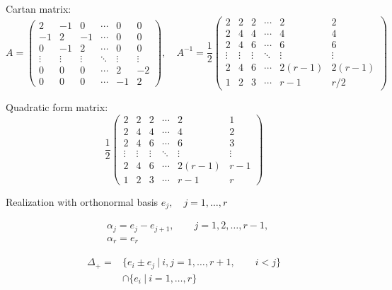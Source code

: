 \documentclass[12pt]{article}
\begin{document}
Cartan matrix:
\[
A=\left(
\begin{array}{cccccc}
 2 & -1& 0 &\cdots & 0 & 0 \\
 -1& 2 & -1 &\cdots & 0 & 0 \\
 0 & -1 & 2 &\cdots & 0 & 0 \\
  \vdots&\vdots &\vdots &\ddots &\vdots &\vdots \\
 0&0 &0 &\cdots & 2& -2\\
 0&0 &0 &\cdots & -1& 2
\end{array}
\right),\quad
A^{-1}=\frac{1}{2}
\left(
\begin{array}{cccccc}
 2& 2& 2 &\cdots & 2 & 2 \\
 2& 4 & 4 &\cdots & 4 & 4 \\
 2& 4 & 6 &\cdots & 6 & 6 \\
  \vdots&\vdots &\vdots &\ddots &\vdots &\vdots \\
 2&4 &6 &\cdots & 2(r-1)& 2(r-1)\\
 1&2 &3 &\cdots & r-1& r/2
\end{array}
\right)
\]

Quadratic form matrix:
\[\frac{1}{2}
\left(
\begin{array}{cccccc}
 2& 2& 2 &\cdots & 2 & 1 \\
 2& 4 & 4 &\cdots & 4 & 2 \\
 2& 4 & 6 &\cdots & 6 & 3 \\
  \vdots&\vdots &\vdots &\ddots &\vdots &\vdots \\
 2&4 &6 &\cdots & 2(r-1)& r-1\\
 1&2 &3 &\cdots & r-1& r
\end{array}
\right)
\]

Realization with orthonormal basis $e_j,\quad j=1,\dots,r$

\begin{align*}
  &\alpha_{j}=e_j-e_{j+1},\qquad j=1,2,\dots,r-1,\\
  &\alpha_{r}=e_r
\end{align*}

\begin{align*}
 \Delta_{+}=&\{e_i \pm e_j\ |\ i,j=1,\dots,r+1,\qquad i<j\} \\
      &\cap
       \{e_{i}\ |\ i=1,\dots,r\}
\end{align*}

\newpage
%
\end{document}
